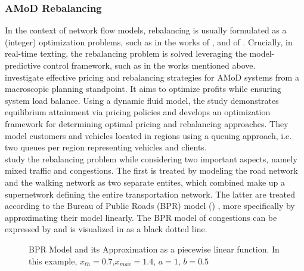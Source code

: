 \subsubsection*{AMoD Rebalancing}
In the context of network flow models, rebalancing is usually formulated as a (integer) optimization problems, such as in the works of ,  and of . Crucially, in real-time texting, the rebalancing problem is solved leveraging the model-predictive control framework, such as in the works mentioned above. \\
 investigate effective pricing and rebalancing strategies for AMoD systems from a macroscopic planning standpoint. It aims to optimize profits while ensuring system load balance. Using a dynamic fluid model, the study demonstrates equilibrium attainment via pricing policies and develops an optimization framework for determining optimal pricing and rebalancing approaches. They model customers and vehicles located in regions using a queuing approach, i.e. two queues per region representing vehicles and clients. \\
 study the rebalancing problem while considering two important aspects, namely mixed traffic and congestions. The first is treated by modeling the road network and the walking network as two separate entites, which combined make up a supernetwork defining the entire transportation network. The latter are treated according to the Bureau of Public Roads (BPR) model (\cite{BPR1964}) , more specifically by approximating their model linearly. The BPR model of congestions can be expressed by  and is visualized in  as a black dotted line. 
\begin{figure}[t]
	\centering
	\caption[BPR Model and Approximation]{BPR Model and its Approximation as a piecewise linear function. In this example, $x_{th} = 0.7$,$x_{max} = 1.4$, $a=1$, $b = 0.5$ }
	\label{fig:bpr_models_approx}
\end{figure}

